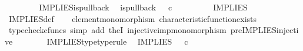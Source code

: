 \begin{isabellebody}
\ \ \ \ \isamarkupfalse%
\isanewline
\ \ \isamarkupfalse%
\isanewline
{}\isamarkupfalse%
%
\endisatagproof
{\isafoldproof}%
%
\isadelimproof
\isanewline
%
\endisadelimproof
\isanewline
{}\isamarkupfalse%
\ IMPLIES{\isacharunderscore}{\kern0pt}is{\isacharunderscore}{\kern0pt}pullback{\isacharcolon}{\kern0pt}\isanewline
\ \ {\isachardoublequoteopen}is{\isacharunderscore}{\kern0pt}pullback\ {\isacharparenleft}{\kern0pt}{\isasymone}{\isasymCoprod}{\isacharparenleft}{\kern0pt}{\isasymone}{\isasymCoprod}{\isasymone}{\isacharparenright}{\kern0pt}{\isacharparenright}{\kern0pt}\ {\isasymone}\ {\isacharparenleft}{\kern0pt}{\isasymOmega}{\isasymtimes}\isactrlsub c{\isasymOmega}{\isacharparenright}{\kern0pt}\ {\isasymOmega}\ {\isacharparenleft}{\kern0pt}{\isasymbeta}\isactrlbsub {\isacharparenleft}{\kern0pt}{\isasymone}{\isasymCoprod}{\isacharparenleft}{\kern0pt}{\isasymone}{\isasymCoprod}{\isasymone}{\isacharparenright}{\kern0pt}{\isacharparenright}{\kern0pt}\isactrlesub {\isacharparenright}{\kern0pt}\ {\isasymt}\ {\isacharparenleft}{\kern0pt}{\isasymlangle}{\isasymt}{\isacharcomma}{\kern0pt}\ {\isasymt}{\isasymrangle}{\isasymamalg}\ {\isacharparenleft}{\kern0pt}{\isasymlangle}{\isasymf}{\isacharcomma}{\kern0pt}\ {\isasymf}{\isasymrangle}\ {\isasymamalg}{\isasymlangle}{\isasymf}{\isacharcomma}{\kern0pt}\ {\isasymt}{\isasymrangle}{\isacharparenright}{\kern0pt}{\isacharparenright}{\kern0pt}\ IMPLIES{\isachardoublequoteclose}\isanewline
%
\isadelimproof
\ \ %
\endisadelimproof
%
\isatagproof
{}\isamarkupfalse%
\ IMPLIES{\isacharunderscore}{\kern0pt}def\isanewline
\ \ \isamarkupfalse%
\ element{\isacharunderscore}{\kern0pt}monomorphism\ characteristic{\isacharunderscore}{\kern0pt}function{\isacharunderscore}{\kern0pt}exists\isanewline
\ \ \isamarkupfalse%
\ {\isacharparenleft}{\kern0pt}typecheck{\isacharunderscore}{\kern0pt}cfuncs{\isacharcomma}{\kern0pt}\ simp\ add{\isacharcolon}{\kern0pt}\ the{}I{}\ injective{\isacharunderscore}{\kern0pt}imp{\isacharunderscore}{\kern0pt}monomorphism\ pre{\isacharunderscore}{\kern0pt}IMPLIES{\isacharunderscore}{\kern0pt}injective{\isacharparenright}{\kern0pt}%
\endisatagproof
{\isafoldproof}%
%
\isadelimproof
\isanewline
%
\endisadelimproof
\ \ \ \ \ \ \isanewline
{}\isamarkupfalse%
\ IMPLIES{\isacharunderscore}{\kern0pt}type{\isacharbrackleft}{\kern0pt}type{\isacharunderscore}{\kern0pt}rule{\isacharbrackright}{\kern0pt}{\isacharcolon}{\kern0pt}\isanewline
\ \ {\isachardoublequoteopen}IMPLIES\ {\isacharcolon}{\kern0pt}\ {\isasymOmega}\ {\isasymtimes}\isactrlsub c\ {\isasymOmega}\ {\isasymrightarrow}\ {\isasymOmega}{\isachardoublequoteclose}\isanewline

\end{isabellebody}
